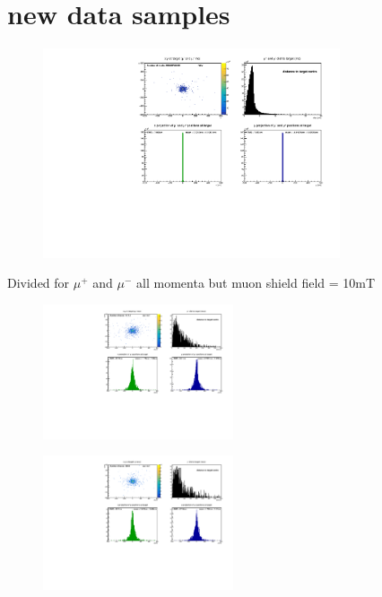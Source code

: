 \section{new data samples}

\begin{frame}[t]{}
  \begin{figure}
    \centering
    \includegraphics[width=0.78\textwidth]{../hists/nofield/new/mc_target_dist.pdf}
  \end{figure}
\end{frame}

\begin{frame}[t]{Divided for $\mu^+$ and $\mu^-$ all momenta but muon shield field = 10mT}
  \begin{multicols}{2}
    \begin{figure}
      \centering
      \includegraphics[width=0.5\textwidth]{../hists/nofield/new/10mT/target_dist_amu.pdf}
    \end{figure}
    \columnbreak
    \begin{figure}
      \centering
      \includegraphics[width=0.5\textwidth]{../hists/nofield/new/10mT/target_dist_mu.pdf}
    \end{figure}
  \end{multicols}
\end{frame}

